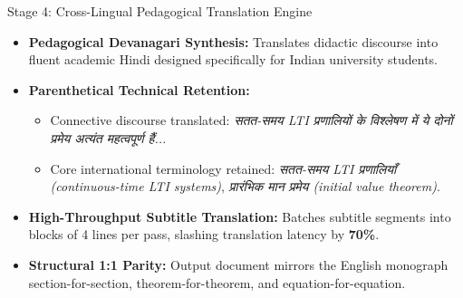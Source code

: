 \documentclass[aspectratio=169,10pt]{beamer}
\begin{document}
\begin{frame}{Stage 4: Cross-Lingual Pedagogical Translation Engine}
  \begin{itemize}
    \item \textbf{Pedagogical Devanagari Synthesis:} Translates didactic discourse into fluent academic Hindi designed specifically for Indian university students.
    \item \textbf{Parenthetical Technical Retention:}
    \begin{itemize}
      \footnotesize
      \item Connective discourse translated: \textit{सतत-समय LTI प्रणालियों के विश्लेषण में ये दोनों प्रमेय अत्यंत महत्वपूर्ण हैं...}
      \item Core international terminology retained: \textit{सतत-समय LTI प्रणालियाँ (continuous-time LTI systems)}, \textit{प्रारंभिक मान प्रमेय (initial value theorem)}.
    \end{itemize}
    \item \textbf{High-Throughput Subtitle Translation:} Batches subtitle segments into blocks of 4 lines per pass, slashing translation latency by \textbf{70\%}.
    \item \textbf{Structural 1:1 Parity:} Output document mirrors the English monograph section-for-section, theorem-for-theorem, and equation-for-equation.
  \end{itemize}
\end{frame}
\end{document}
